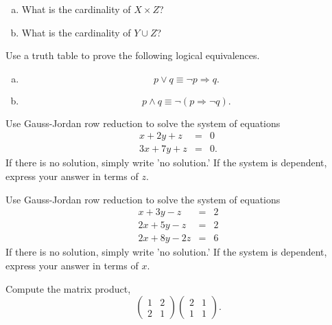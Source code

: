 \documentclass[12pt]{amsart}
\begin{document}
\begin{thm}[10 Points]
  \begin{enumerate}[(a)]
  \item
    What is the cardinality of $X \times Z$?
    \vspace{1in}
  \item
    What is the cardinality of $Y \cup Z$?
    \vspace{1in}
  \end{enumerate}
\end{thm}
\newpage

\begin{thm}[10 Points]\label{ex9}
  Use a truth table to prove the following logical equivalences.
  \begin{enumerate}[(a)]
  \item
    $$p \vee q \equiv \neg p \Rightarrow q.$$
    \vspace{2in}
  \item
    $$p \wedge q \equiv \neg\left(p \Rightarrow \neg q\right).$$
    \vspace{2in}
  \end{enumerate}
\end{thm}

\newpage
\begin{thm}[15 Points]\label{ex2}
  Use Gauss-Jordan row reduction to solve the system of equations
  \begin{eqnarray*}
    x + 2y + z &=& 0\\
    3x + 7y + z &=& 0.
  \end{eqnarray*}
  If there is no solution, simply write 'no solution.'  If the system is dependent, express your answer in terms of $z$.
  \vspace{2in}
\end{thm}

\begin{thm}[15 Points]\label{ex3}
  Use Gauss-Jordan row reduction to solve the system of equations
  \begin{eqnarray*}
    x + 3y - z &=& 2\\
    2x + 5y - z &=& 2\\
    2x + 8y - 2z &=& 6
  \end{eqnarray*}
  If there is no solution, simply write 'no solution.'  If the system is dependent, express your answer in terms of $x$.
\end{thm}

\newpage

\begin{thm}[10 Points]\label{ex4}
  Compute the matrix product,
  $$\left(\begin{array}{cc}
    1 & 2\\
    2 & 1
  \end{array}\right) 
  \left(\begin{array}{cc}
    2 & 1\\
    1 & 1
  \end{array}\right).$$
  \vspace{2in}
\end{thm}
\end{document}
